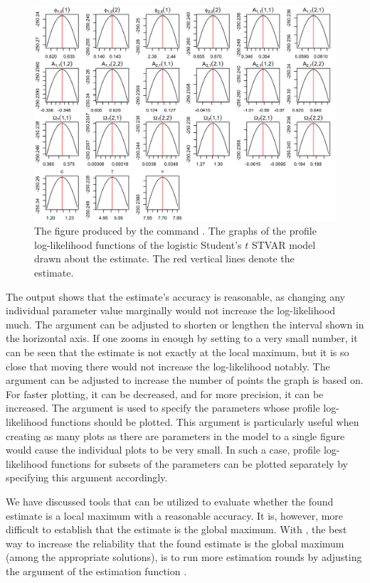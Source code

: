 \documentclass[nojss]{jss}
\begin{document}
\begin{figure}[t]
  \centering
  \includegraphics{figures/profilelogliks.png}
  \caption{The figure produced by the command . The graphs of the profile log-likelihood functions of the logistic Student's $t$ STVAR model drawn about the estimate. The red vertical lines denote the estimate.}
\label{fig:proflogliks}
\end{figure}

The output shows that the estimate's accuracy is reasonable, as changing any individual parameter value marginally would not increase the log-likelihood much. The argument  can be adjusted to shorten or lengthen the interval shown in the horizontal axis. If one zooms in enough by setting  to a very small number, it can be seen that the estimate is not exactly at the local maximum, but it is so close that moving there would not increase the log-likelihood notably. The argument  can be adjusted to increase the number of points the graph is based on. For faster plotting, it can be decreased, and for more precision, it can be increased. The argument  is used to specify the parameters whose profile log-likelihood functions should be plotted. This argument is particularly useful when creating as many plots as there are parameters in the model to a single figure would cause the individual plots to be very small. In such a case, profile log-likelihood functions for subsets of the parameters can be plotted separately by specifying this argument accordingly.

We have discussed tools that can be utilized to evaluate whether the found estimate is a local maximum with a reasonable accuracy. It is, however, more difficult to establish that the estimate is the global maximum. With , the best way to increase the reliability that the found estimate is the global maximum (among the appropriate solutions), is to run more estimation rounds by adjusting the argument  of the estimation function .
\end{document}
